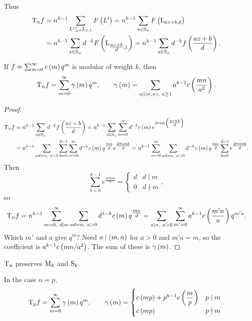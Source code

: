 Thus
\begin{align*}
\T_nf
& = n^{k - 1}\sum_{L' \subseteq_n \L_{z, 1}} F\br{L'}
= n^{k - 1}\sum_{s \in \S_n} F\br{\L_{az + b, d}} \\
& = n^{k - 1}\sum_{s \in \S_n} d^{-k}F\br{\L_{\tfrac{az + b}{d}, 1}}
= n^{k - 1}\sum_{s \in \S_n} d^{-k}f\br{\dfrac{az + b}{d}}.
\end{align*}

\begin{theorem}
If $ f = \sum_{m = 0}^\infty c\br{m}q^m $ is modular of weight $ k $, then
$$ \T_nf = \sum_{m = 0}^\infty \gamma\br{m}q^m, \qquad \gamma\br{m} = \sum_{a \mid \br{m, n}, \ a \ge 1} a^{k - 1}c\br{\dfrac{mn}{a^2}}. $$
\end{theorem}

\begin{proof}
\begin{align*}
\T_nf
& = n^{k - 1}\sum_{s \in \S_n} d^{-k}f\br{\dfrac{az + b}{d}}
= n^{k - 1}\sum_{s \in \S_n} \sum_{m = 0}^\infty d^{-k}c\br{m}e^{2\pi im\br{\tfrac{az + b}{d}}} \\
& = n^{k - 1}\sum_{ad = n, \ a > 0} \sum_{b = 0}^{d - 1} \sum_{m = 0}^\infty d^{-k}c\br{m}q^{\tfrac{ma}{d}}e^{\tfrac{2\pi imb}{d}}
= n^{k - 1}\sum_{m = 0}^\infty \sum_{ad = n, \ a > 0} d^{-k}c\br{m}q^{\tfrac{ma}{d}}\sum_{b = 0}^{d - 1} e^{\tfrac{2\pi imb}{d}}.
\end{align*}
Then
$$ \sum_{b = 0}^{d - 1} e^{\tfrac{2\pi imb}{d}} =
\begin{cases}
d & d \mid m \\
0 & d \nmid m
\end{cases},
$$
so
$$ \T_nf = n^{k - 1}\sum_{m = 0, \ d \mid m}^\infty \sum_{ad = n, \ a > 0} d^{1 - k}c\br{m}q^{\tfrac{ma}{d}} = \sum_{a \mid n, \ a > 0} \sum_{m' = 0}^\infty a^{k - 1}c\br{\dfrac{m'n}{a}}q^{m'a}. $$
Which $ m' $ and $ a $ give $ q^m $? Need $ a \mid \br{m, n} $ for $ a > 0 $ and $ m'a = m $, so the coefficient is $ a^{k - 1}c\br{mn / a^2} $. The sum of these is $ \gamma\br{m} $.
\end{proof}

\begin{corollary}
$ \T_n $ preserves $ \M_k $ and $ \S_k $.
\end{corollary}

In the case $ n = p $,
$$ \T_pf = \sum_{m = 0}^\infty \gamma\br{m}q^m, \qquad \gamma\br{m} =
\begin{cases}
c\br{mp} + p^{k - 1}c\br{\dfrac{m}{p}} & p \mid m \\
c\br{mp} & p \nmid m
\end{cases}.
$$

